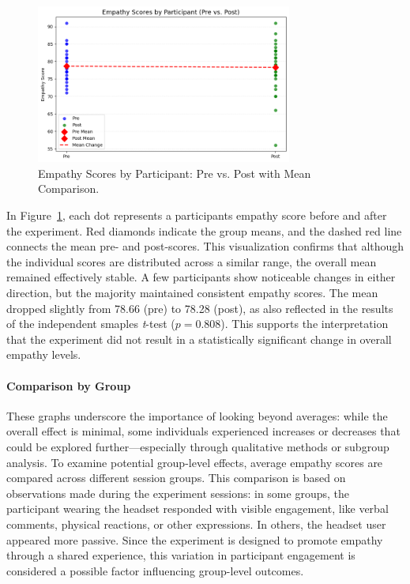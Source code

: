 \begin{figure}[htbp]
    \centering
    \includegraphics[width=0.75\textwidth]{../../Figures/emph-comparison-means.png}
    \caption{Empathy Scores by Participant: Pre vs. Post with Mean Comparison.}
    \label{fig:empathy_means_line}
\end{figure}

\vspace{1em}

In Figure~\ref{fig:empathy_means_line}, each dot represents a participants empathy score before and after the experiment. Red diamonds indicate the group means, and the dashed red line connects the mean pre- and post-scores. This visualization confirms that although the individual scores are distributed across a similar range, the overall mean remained effectively stable. A few participants show noticeable changes in either direction, but the majority maintained consistent empathy scores. The mean dropped slightly from 78.66 (pre) to 78.28 (post), as also reflected in the results of the independent smaples \textit{t}-test ($p = 0.808$). This supports the interpretation that the experiment did not result in a statistically significant change in overall empathy levels.

\paragraph{Comparison by Group}

These graphs underscore the importance of looking beyond averages: while the overall effect is minimal, some individuals experienced increases or decreases that could be explored further—especially through qualitative methods or subgroup analysis. To examine potential group-level effects, average empathy scores are compared across different session groups. This comparison is based on observations made during the experiment sessions: in some groups, the participant wearing the headset responded with visible engagement, like verbal comments, physical reactions, or other expressions. In others, the headset user appeared more passive. Since the experiment is designed to promote empathy through a shared experience, this variation in participant engagement is considered a possible factor influencing group-level outcomes.


